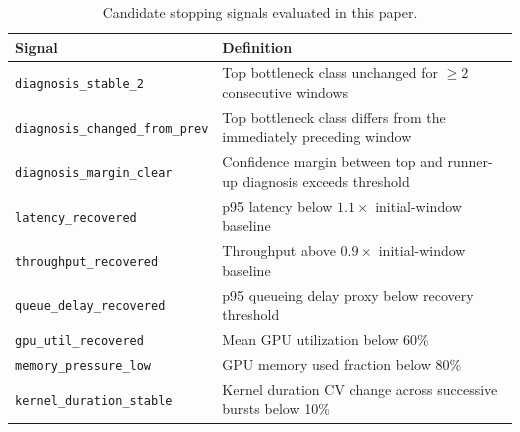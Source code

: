 \begin{table}[h]
\centering
\caption{Candidate stopping signals evaluated in this paper.}
\label{tab:stopping-signals}
\scriptsize
\setlength{\tabcolsep}{3pt}
\begin{tabularx}{\columnwidth}{@{}l >{\raggedright\arraybackslash}X@{}}
\toprule
\textbf{Signal} & \textbf{Definition} \\
\midrule
\texttt{diagnosis\_stable\_2}            & Top bottleneck class unchanged for $\geq 2$ consecutive windows \\
\texttt{diagnosis\_changed\_from\_prev}  & Top bottleneck class differs from the immediately preceding window \\
\texttt{diagnosis\_margin\_clear}        & Confidence margin between top and runner-up diagnosis exceeds threshold \\
\texttt{latency\_recovered}              & p95 latency below $1.1\times$ initial-window baseline \\
\texttt{throughput\_recovered}           & Throughput above $0.9\times$ initial-window baseline \\
\texttt{queue\_delay\_recovered}         & p95 queueing delay proxy below recovery threshold \\
\texttt{gpu\_util\_recovered}            & Mean GPU utilization below 60\% \\
\texttt{memory\_pressure\_low}           & GPU memory used fraction below 80\% \\
\texttt{kernel\_duration\_stable}        & Kernel duration CV change across successive bursts below 10\% \\
\bottomrule
\end{tabularx}
\end{table}



